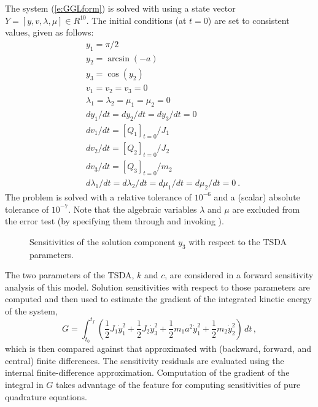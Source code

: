 The system (\ref{e:GGLform}) is solved with {\idas} using a state vector
$Y = [y, v, \lambda, \mu] \in R^{10}$.   The initial conditions (at $t = 0$)
are set to consistent values, given as follows:
\begin{equation*}
  \begin{split}
    &y_1 = \pi/2 \\
    &y_2 = \arcsin(-a) \\
    &y_3 = \cos(y_2) \\
    &v_1 = v_2 = v_3 = 0 \\
    &\lambda_1 = \lambda_2 = \mu_1 = \mu_2 = 0 \\
    &dy_1/dt = dy_2/dt = dy_3/dt = 0 \\
    &dv_1/dt = \left[Q_1\right]_{t=0} / J_1 \\
    &dv_2/dt = \left[Q_2\right]_{t=0} / J_2 \\
    &dv_3/dt = \left[Q_3\right]_{t=0} / m_2 \\
    &d\lambda_1/dt = d\lambda_2/dt = d\mu_1/dt = d\mu_2/dt = 0 ~.
  \end{split}
\end{equation*}
The problem is solved with a relative tolerance of $10^{-6}$ and a (scalar) absolute tolerance
of $10^{-7}$. Note that the algebraic variables $\lambda$ and $\mu$ are excluded from the error
test (by specifying them through  and invoking ).


\begin{figure}
  {\centerline{}}
  \caption{Sensitivities of the solution component $y_3$ with respect to the TSDA parameters.}
  \label{f:x2sensi}
\end{figure}
The two parameters of the TSDA, $k$ and $c$, are considered in a forward
sensitivity analysis of this model. Solution sensitivities with respect
to those parameters are computed and then used to estimate the gradient
of the integrated kinetic energy of the system,
\begin{equation}
  G = \int_{t_0}^{t_f} \left(    
    \frac{1}{2} J_1 \dot y_1^2 + \frac{1}{2} J_2 \dot y_3^2 + \frac{1}{2} m_1 a^2 \dot y_1^2 + \frac{1}{2} m_2 \dot y_2^2
  \right) \, dt \, ,
\end{equation}
which is then compared against that approximated with (backward, forward, and central) finite differences.
The sensitivity residuals are evaluated using the {\idas} internal finite-difference approximation.
Computation of the gradient of the integral in $G$ takes advantage of the {\idas} feature for computing
sensitivities of pure quadrature equations.

